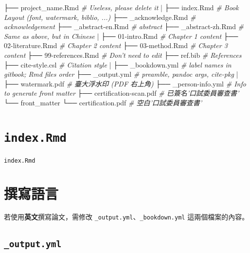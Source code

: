 \documentclass[oneside]{book}
\newenvironment{Shaded}{\begin{snugshade}}{\end{snugshade}}
\newcommand{\CommentTok}[1]{\textcolor[rgb]{0.56,0.35,0.01}{\textit{#1}}}
\newcommand{\NormalTok}[1]{#1}
\begin{document}
\begin{Shaded}
\begin{Highlighting}[]
\NormalTok{├── project_name.Rmd     }\CommentTok{# Useless, please delete it}
\NormalTok{|}
\NormalTok{├── index.Rmd            }\CommentTok{# Book Layout (font, watermark, biblio, ...)}
\NormalTok{├── _acknowledge.Rmd     }\CommentTok{# acknowledgement}
\NormalTok{├── _abstract-en.Rmd     }\CommentTok{# abstract}
\NormalTok{├── _abstract-zh.Rmd     }\CommentTok{# Same as above, but in Chinese}
\NormalTok{|}
\NormalTok{├── 01-intro.Rmd         }\CommentTok{# Chapter 1 content}
\NormalTok{├── 02-literature.Rmd    }\CommentTok{# Chapter 2 content}
\NormalTok{├── 03-method.Rmd        }\CommentTok{# Chapter 3 content}
\NormalTok{├── 99-references.Rmd    }\CommentTok{# Don't need to edit}
\NormalTok{├── ref.bib              }\CommentTok{# References}
\NormalTok{├── cite-style.csl       }\CommentTok{# Citation style}
\NormalTok{|}
\NormalTok{├── _bookdown.yml        }\CommentTok{# label names in gitbook; Rmd files order}
\NormalTok{├── _output.yml          }\CommentTok{# preamble, pandoc args, cite-pkg}
\NormalTok{|}
\NormalTok{├── watermark.pdf        }\CommentTok{# 臺大浮水印 (PDF 右上角)}
\NormalTok{├── _person-info.yml      }\CommentTok{# Info to generate front matter}
\NormalTok{├── certification-scan.pdf  }\CommentTok{# 已簽名'口試委員審查書'}
\NormalTok{└── front_matter}
\NormalTok{    └── certification.pdf   }\CommentTok{# 空白'口試委員審查書'}
\end{Highlighting}
\end{Shaded}

\section{\texorpdfstring{\texttt{index.Rmd}}{index.Rmd}}\label{index.rmd}

\texttt{index.Rmd}

\section{撰寫語言}\label{write-lang}

若使用\textbf{英文}撰寫論文，需修改
\texttt{\_output.yml}、\texttt{\_bookdown.yml} 這兩個檔案的內容。

\subsection{\texorpdfstring{\texttt{\_output.yml}}{\_output.yml}}\label{output.yml}
\end{document}
